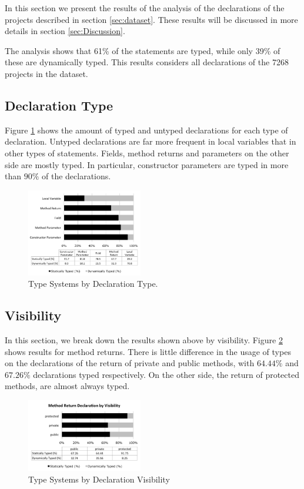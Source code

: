 \documentclass[preprint]{sigplanconf}
\begin{document}
In this section we present the results of the analysis of the declarations of the projects described in section \ref{sec:dataset}. 
These results will be discussed in more details in section \ref{sec:Discussion}.

The analysis shows that 61\% of the statements are typed, while only 39\% of these are dynamically typed. This results considers all declarations of the 7268 projects in the dataset.

\subsection{Declaration Type\label{sub:declaration-type-results}}
Figure \ref{fig:tipo_declaracao} shows the amount of typed and untyped declarations for each type of declaration. 
Untyped declarations are far more frequent in local variables that in other types of statements.
Fields, method returns and parameters on the other side are mostly typed. In particular, constructor parameters are typed in more than $90\%$ of the declarations.

\begin{figure}[ht]
\centering 
\includegraphics[width=0.45\textwidth]{images/tipo} 
\caption{Type Systems by Declaration Type.}
\label{fig:tipo_declaracao} 
\end{figure}

\subsection{Visibility\label{sub:visibility-results}}
In this section, we break down the results shown above by visibility. 
Figure \ref{fig:method_return_visibility} shows results for method returns.
There is little difference in the usage of types on the declarations of the return of private and public methods, with $64.44\%$ and $67.26\%$ declarations typed respectively.
On the other side, the return of protected methods, are almost always typed.

\begin{figure}[ht]
\centering \includegraphics[width=0.45\textwidth]{images/method_return_visibility} 
\caption{Type Systems by Declaration Visibility}
\label{fig:method_return_visibility} 
\end{figure}
\end{document}
